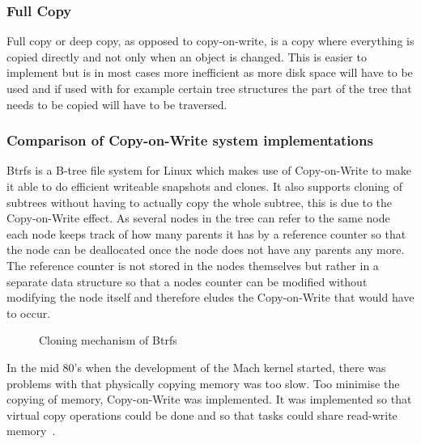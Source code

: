 \documentclass[a4paper,12pt]{article}
\newcounter{subsubsubsection}[subsubsection]
\begin{document}
\subsubsection{Full Copy}
Full copy or deep copy, as opposed to copy-on-write, is a copy where everything is copied directly
and not only when an object is changed. This is easier to implement but is in most cases more
inefficient as more disk space will have to be used and if used with for example certain tree 
structures the part of the tree that needs to be copied will have to be traversed. 

\subsubsection{Comparison of Copy-on-Write system implementations}
Btrfs is a B-tree file system for Linux which makes use of Copy-on-Write to make it able to do
efficient writeable snapshots and clones. It also supports cloning of subtrees without having to
actually copy the whole subtree, this is due to the Copy-on-Write effect. As several nodes in the
tree can refer to the same node each node keeps track of how many parents it has by a reference
counter so that the node can be deallocated once the node does not have any parents any more. The
reference counter is not stored in the nodes themselves but rather in a separate data structure so
that a nodes counter can be modified without modifying the node itself and therefore eludes the
Copy-on-Write that would have to occur.

\begin{figure}[H] 
    \caption{Cloning mechanism of Btrfs~\cite{BTRFS}}
    \label{fig:btrfs_tree}
\end{figure}

In the mid 80's when the development of the Mach kernel started, there was problems with that
physically copying memory was too slow. Too minimise the copying of memory, Copy-on-Write was
implemented. It was implemented so that virtual copy operations could be done and so that tasks
could share read-write memory~\cite{MACH}.
\end{document}
